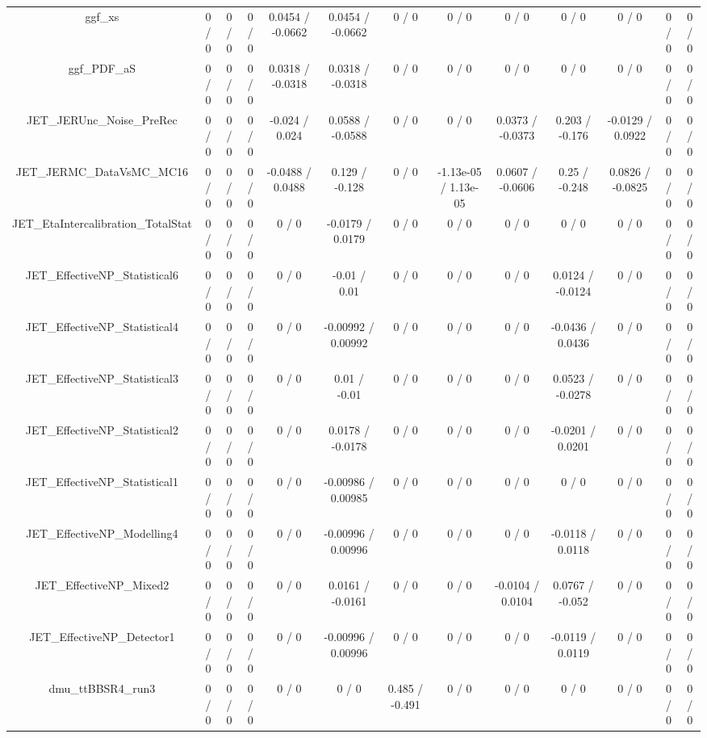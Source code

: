 \documentclass[10pt]{article}
\begin{document}
\begin{table}[htbp]
\begin{center}
\begin{tabular}{|c|c|c|c|c|c|c|c|c|c|c|c|c|}
  ggf_xs & 0 / 0 & 0 / 0 & 0 / 0 & 0.0454 / -0.0662 & 0.0454 / -0.0662 & 0 / 0 & 0 / 0 & 0 / 0 & 0 / 0 & 0 / 0 & 0 / 0 & 0 / 0 \\ 
  ggf_PDF_aS & 0 / 0 & 0 / 0 & 0 / 0 & 0.0318 / -0.0318 & 0.0318 / -0.0318 & 0 / 0 & 0 / 0 & 0 / 0 & 0 / 0 & 0 / 0 & 0 / 0 & 0 / 0 \\ 
  JET_JERUnc_Noise_PreRec & 0 / 0 & 0 / 0 & 0 / 0 & -0.024 / 0.024 & 0.0588 / -0.0588 & 0 / 0 & 0 / 0 & 0.0373 / -0.0373 & 0.203 / -0.176 & -0.0129 / 0.0922 & 0 / 0 & 0 / 0 \\ 
  JET_JERMC_DataVsMC_MC16 & 0 / 0 & 0 / 0 & 0 / 0 & -0.0488 / 0.0488 & 0.129 / -0.128 & 0 / 0 & -1.13e-05 / 1.13e-05 & 0.0607 / -0.0606 & 0.25 / -0.248 & 0.0826 / -0.0825 & 0 / 0 & 0 / 0 \\ 
  JET_EtaIntercalibration_TotalStat & 0 / 0 & 0 / 0 & 0 / 0 & 0 / 0 & -0.0179 / 0.0179 & 0 / 0 & 0 / 0 & 0 / 0 & 0 / 0 & 0 / 0 & 0 / 0 & 0 / 0 \\ 
  JET_EffectiveNP_Statistical6 & 0 / 0 & 0 / 0 & 0 / 0 & 0 / 0 & -0.01 / 0.01 & 0 / 0 & 0 / 0 & 0 / 0 & 0.0124 / -0.0124 & 0 / 0 & 0 / 0 & 0 / 0 \\ 
  JET_EffectiveNP_Statistical4 & 0 / 0 & 0 / 0 & 0 / 0 & 0 / 0 & -0.00992 / 0.00992 & 0 / 0 & 0 / 0 & 0 / 0 & -0.0436 / 0.0436 & 0 / 0 & 0 / 0 & 0 / 0 \\ 
  JET_EffectiveNP_Statistical3 & 0 / 0 & 0 / 0 & 0 / 0 & 0 / 0 & 0.01 / -0.01 & 0 / 0 & 0 / 0 & 0 / 0 & 0.0523 / -0.0278 & 0 / 0 & 0 / 0 & 0 / 0 \\ 
  JET_EffectiveNP_Statistical2 & 0 / 0 & 0 / 0 & 0 / 0 & 0 / 0 & 0.0178 / -0.0178 & 0 / 0 & 0 / 0 & 0 / 0 & -0.0201 / 0.0201 & 0 / 0 & 0 / 0 & 0 / 0 \\ 
  JET_EffectiveNP_Statistical1 & 0 / 0 & 0 / 0 & 0 / 0 & 0 / 0 & -0.00986 / 0.00985 & 0 / 0 & 0 / 0 & 0 / 0 & 0 / 0 & 0 / 0 & 0 / 0 & 0 / 0 \\ 
  JET_EffectiveNP_Modelling4 & 0 / 0 & 0 / 0 & 0 / 0 & 0 / 0 & -0.00996 / 0.00996 & 0 / 0 & 0 / 0 & 0 / 0 & -0.0118 / 0.0118 & 0 / 0 & 0 / 0 & 0 / 0 \\ 
  JET_EffectiveNP_Mixed2 & 0 / 0 & 0 / 0 & 0 / 0 & 0 / 0 & 0.0161 / -0.0161 & 0 / 0 & 0 / 0 & -0.0104 / 0.0104 & 0.0767 / -0.052 & 0 / 0 & 0 / 0 & 0 / 0 \\ 
  JET_EffectiveNP_Detector1 & 0 / 0 & 0 / 0 & 0 / 0 & 0 / 0 & -0.00996 / 0.00996 & 0 / 0 & 0 / 0 & 0 / 0 & -0.0119 / 0.0119 & 0 / 0 & 0 / 0 & 0 / 0 \\ 
  dmu_ttBBSR4_run3 & 0 / 0 & 0 / 0 & 0 / 0 & 0 / 0 & 0 / 0 & 0.485 / -0.491 & 0 / 0 & 0 / 0 & 0 / 0 & 0 / 0 & 0 / 0 & 0 / 0 \\ 

\end{tabular}
\end{center}
\end{table}
\end{document}
